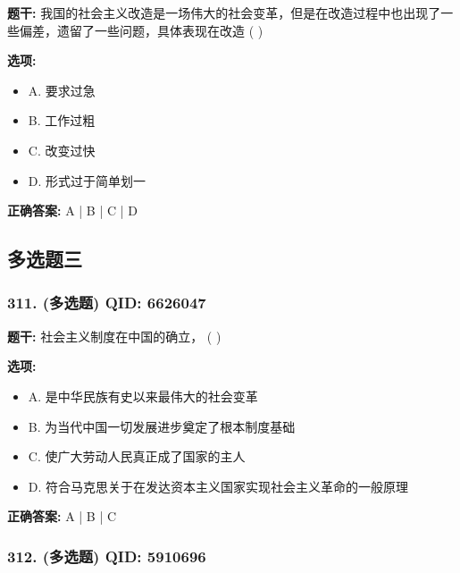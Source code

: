 \documentclass[12pt,UTF8]{ctexart}
\begin{document}
\textbf{题干:}
我国的社会主义改造是一场伟大的社会变革，但是在改造过程中也出现了一些偏差，遗留了一些问题，具体表现在改造  ( )

\textbf{选项:}
\begin{itemize}[leftmargin=*]

  \item A. 要求过急

  \item B. 工作过粗

  \item C. 改变过快

  \item D. 形式过于简单划一

\end{itemize}

\textbf{正确答案:}
A | B | C | D

\vspace{0.3em}\hrulefill\vspace{0.7em}

\subsection*{多选题三}

\subsubsection*{311. (多选题) \small QID: 6626047}

\textbf{题干:}
社会主义制度在中国的确立，  ( )

\textbf{选项:}
\begin{itemize}[leftmargin=*]

  \item A. 是中华民族有史以来最伟大的社会变革

  \item B. 为当代中国一切发展进步奠定了根本制度基础

  \item C. 使广大劳动人民真正成了国家的主人

  \item D. 符合马克思关于在发达资本主义国家实现社会主义革命的一般原理

\end{itemize}

\textbf{正确答案:}
A | B | C

\vspace{0.3em}\hrulefill\vspace{0.7em}

\subsubsection*{312. (多选题) \small QID: 5910696}
\end{document}
